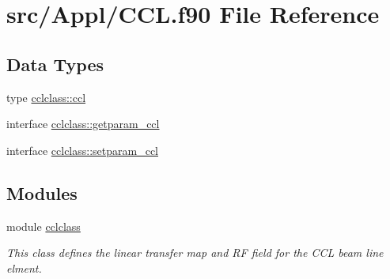 \hypertarget{_c_c_l_8f90}{}\section{src/\+Appl/\+C\+CL.f90 File Reference}
\label{_c_c_l_8f90}
\subsection*{Data Types}
\begin{DoxyCompactItemize}
\item 
type \mbox{\hyperlink{namespacecclclass_structcclclass_1_1ccl}{cclclass\+::ccl}}
\item 
interface \mbox{\hyperlink{interfacecclclass_1_1getparam__ccl}{cclclass\+::getparam\+\_\+ccl}}
\item 
interface \mbox{\hyperlink{interfacecclclass_1_1setparam__ccl}{cclclass\+::setparam\+\_\+ccl}}
\end{DoxyCompactItemize}
\subsection*{Modules}
\begin{DoxyCompactItemize}
\item 
module \mbox{\hyperlink{namespacecclclass}{cclclass}}
\begin{DoxyCompactList}\small\item\em This class defines the linear transfer map and RF field for the C\+CL beam line elment. \end{DoxyCompactList}\end{DoxyCompactItemize}
